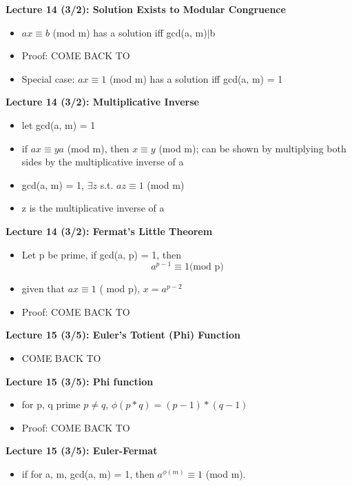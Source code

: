 \documentclass[twocolumn]{article}
\begin{document}
\textbf{Lecture 14 (3/2): Solution Exists to Modular Congruence}
\begin{itemize}
    \item $ax \equiv b$ (mod m) has a solution iff gcd(a, m)$|$b
    \item Proof: COME BACK TO
    \item Special case: $ax\equiv 1$ (mod m) has a solution iff gcd(a, m) = 1
\end{itemize}

\textbf{Lecture 14 (3/2): Multiplicative Inverse}
\begin{itemize}
    \item let gcd(a, m) = 1
    \item if $ax \equiv ya$ (mod m), then $x \equiv y$ (mod m); can be shown by multiplying both sides by the multiplicative inverse of a
    \item gcd(a, m) = 1, $\exists z$ s.t. $az \equiv 1$ (mod m)
    \item z is the multiplicative inverse of a
\end{itemize}

\textbf{Lecture 14 (3/2): Fermat's Little Theorem}
\begin{itemize}
    \item Let p be prime, if gcd(a, p) = 1, then $$a^{p-1} \equiv 1 \text{(mod p)}$$
    \item given that $ax \equiv 1$ ( mod p), $x = a^{p-2}$
    \item Proof: COME BACK TO
\end{itemize}

\textbf{Lecture 15 (3/5): Euler's Totient (Phi) Function}
\begin{itemize}
    \item COME BACK TO
\end{itemize}

\textbf{Lecture 15 (3/5): Phi function}
\begin{itemize}
    \item for p, q prime $p \neq q$, $\phi(p*q) = (p-1)*(q-1)$
    \item Proof: COME BACK TO
\end{itemize}

\textbf{Lecture 15 (3/5): Euler-Fermat}
\begin{itemize}
    \item if for a, m, gcd(a, m) = 1, then $a^{\phi(m)}\equiv 1$ (mod m).
\end{itemize}
\end{document}
